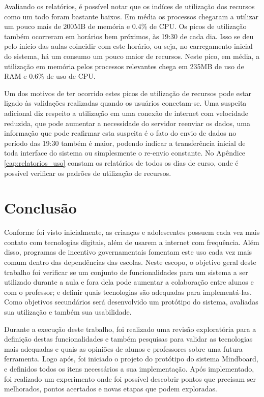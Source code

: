 Avaliando os relatórios, é possível notar que os indíces de utilização dos recursos como um todo foram bastante baixos. Em média os processos chegaram a utilizar um pouco mais de 200MB de memória e 0.4\% de CPU. Os picos de utilização também ocorreram em horários bem próximos, às 19:30 de cada dia. Isso se deu pelo início das aulas coincidir com este horário, ou seja, no carregamento inicial do sistema, há um consumo um pouco maior de recursos. Neste pico, em média, a utilização em memória pelos processos relevantes chega em 235MB de uso de RAM e 0.6\% de uso de CPU.

Um dos motivos de ter ocorrido estes picos de utilização de recursos pode estar ligado às validações realizadas quando os usuários conectam-se. Uma suspeita adicional diz respeito a utilização em uma conexão de internet com velocidade reduzida, que pode aumentar a necessidade do servidor reenviar os dados, uma informação que pode reafirmar esta suspeita é o fato do envio de dados no período das 19:30 também é maior, podendo indicar a transferência inicial de toda interface do sistema ou simplesmente o re-envio constante. No Apêndice \ref{cap:relatorios_uso} constam os relatórios de todos os dias de curso, onde é possível verificar os padrões de utilização de recursos.

\chapter{Conclusão}
\label{cap:conclusao}

Conforme foi visto inicialmente, as crianças e adolescentes possuem cada vez mais contato com tecnologias digitais, além de usarem a internet com frequência. Além disso, programas de incentivo governamentais fomentam este uso cada vez mais comum dentro das dependências das escolas. Neste escopo, o objetivo geral deste trabalho foi verificar se um conjunto de funcionalidades para um sistema a ser utilizado durante a aula e fora dela pode aumentar a colaboração entre alunos e com o professor; e definir quais tecnologias são adequadas para implementá-las. Como objetivos secundários será desenvolvido um protótipo do sistema, avaliadas sua utilização e também sua usabilidade.

Durante a execução deste trabalho, foi realizado uma revisão exploratória para a definição destas funcionalidades e também pesquisas para validar as tecnologias mais adequadas e quais as opiniões de alunos e professores sobre uma futura ferramenta. Logo após, foi iniciado o projeto do protótipo do sistema Mindboard, e definidos todos os itens necessários a sua implementação. Após implementado, foi realizado um experimento onde foi possível descobrir pontos que precisam ser melhorados, pontos acertados e novas etapas que podem exploradas.

